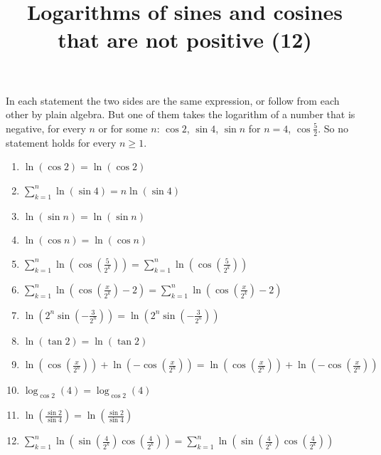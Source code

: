 \documentclass[11pt,a4paper]{article}
\title{Logarithms of sines and cosines that are not positive (12)}
\author{}
\date{}
\begin{document}
\maketitle
In each statement the two sides are the same expression, or follow from each other by plain algebra. But one of them takes the logarithm of a number that is negative, for every $n$ or for some $n$: $\cos 2$, $\sin 4$, $\sin n$ for $n = 4$, $\cos\frac{5}{2}$. So no statement holds for every $n \ge 1$.

\begin{enumerate}
\item $\displaystyle \ln\left(\cos 2\right) = \ln\left(\cos 2\right)$
\item $\displaystyle \sum_{k=1}^{n} \ln\left(\sin 4\right) = n \ln\left(\sin 4\right)$
\item $\displaystyle \ln\left(\sin n\right) = \ln\left(\sin n\right)$
\item $\displaystyle \ln\left(\cos n\right) = \ln\left(\cos n\right)$
\item $\displaystyle \sum_{k=1}^{n} \ln\left(\cos\left(\frac{5}{2^{k}}\right)\right) = \sum_{k=1}^{n} \ln\left(\cos\left(\frac{5}{2^{k}}\right)\right)$
\item $\displaystyle \sum_{k=1}^{n} \ln\left(\cos\left(\frac{x}{2^{k}}\right) - 2\right) = \sum_{k=1}^{n} \ln\left(\cos\left(\frac{x}{2^{k}}\right) - 2\right)$
\item $\displaystyle \ln\left(2^{n} \sin\left(-\frac{3}{2^{n}}\right)\right) = \ln\left(2^{n} \sin\left(-\frac{3}{2^{n}}\right)\right)$
\item $\displaystyle \ln\left(\tan 2\right) = \ln\left(\tan 2\right)$
\item $\displaystyle \ln\left(\cos\left(\frac{x}{2^{n}}\right)\right) + \ln\left(-\cos\left(\frac{x}{2^{n}}\right)\right) = \ln\left(\cos\left(\frac{x}{2^{n}}\right)\right) + \ln\left(-\cos\left(\frac{x}{2^{n}}\right)\right)$
\item $\displaystyle \log_{\cos 2}\left(4\right) = \log_{\cos 2}\left(4\right)$
\item $\displaystyle \ln\left(\frac{\sin 2}{\sin 4}\right) = \ln\left(\frac{\sin 2}{\sin 4}\right)$
\item $\displaystyle \sum_{k=1}^{n} \ln\left(\sin\left(\frac{4}{2^{k}}\right) \cos\left(\frac{4}{2^{k}}\right)\right) = \sum_{k=1}^{n} \ln\left(\sin\left(\frac{4}{2^{k}}\right) \cos\left(\frac{4}{2^{k}}\right)\right)$
\end{enumerate}
\end{document}
